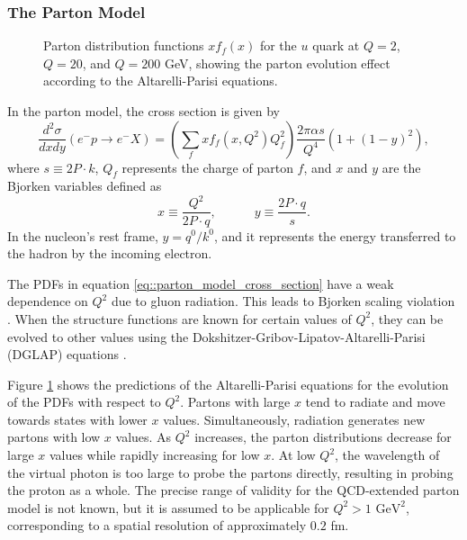 \subsubsection{The Parton Model}
\label{sssec::parton_model}
    \begin{figure}[t!]
        \centering
        \caption[$Q^2$ dependence of $x$ PDF for the $u$ quark.]{Parton distribution functions $xf_f(x)$ for the $u$ quark at $Q = 2$, $Q = 20$, and $Q = 200$ GeV, showing the parton evolution effect according to the Altarelli-Parisi equations.} %
        \label{fig::q2dependenceu}
    \end{figure}

    In the parton model, the cross section is given by
    \begin{equation}
        \label{eq::parton_model_cross_section}
        \frac{d^2\sigma}{dxdy} \left( e^-p \rightarrow e^-X \right) =
                \left( \sum_f xf_f \left( x, Q^2 \right) Q_f^2 \right)
                \frac{2\pi\alpha s}{Q^4} \left( 1 + \left( 1 - y \right)^2 \right),
    \end{equation}
    where $s \equiv 2P\cdot k$, $Q_f$ represents the charge of parton $f$, and $x$ and $y$ are the Bjorken variables defined as
    \begin{equation*}
        x \equiv \frac{Q^2}{2P\cdot q}, \hspace{36pt} y \equiv \frac{2 P\cdot q}{s}.
    \end{equation*}
    In the nucleon's rest frame, $y = q^0/k^0$, and it represents the energy transferred to the hadron by the incoming electron.

    The PDFs in equation \eqref{eq::parton_model_cross_section} have a weak dependence on $Q^2$ due to gluon radiation.
    This leads to Bjorken scaling violation \cite{halzen1991}.
    When the structure functions are known for certain values of $Q^2$, they can be evolved to other values using the Dokshitzer-Gribov-Lipatov-Altarelli-Parisi (DGLAP) equations \cite{dokshitzer1991}.

    Figure \ref{fig::q2dependenceu} shows the predictions of the Altarelli-Parisi equations for the evolution of the PDFs with respect to $Q^2$.
    Partons with large $x$ tend to radiate and move towards states with lower $x$ values.
    Simultaneously, radiation generates new partons with low $x$ values.
    As $Q^2$ increases, the parton distributions decrease for large $x$ values while rapidly increasing for low $x$.
    At low $Q^2$, the wavelength of the virtual photon is too large to probe the partons directly, resulting in probing the proton as a whole.
    The precise range of validity for the QCD-extended parton model is not known, but it is assumed to be applicable for $Q^2 > 1 \text{ GeV}^2$, corresponding to a spatial resolution of approximately $0.2$ fm.
